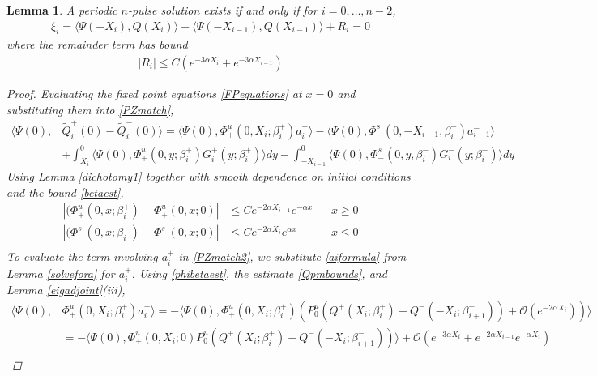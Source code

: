 \documentclass[10pt,reqno]{amsart}
\theoremstyle{plain}
\newtheorem{lemma}[theorem]{Lemma}
\theoremstyle{definition}
\theoremstyle{remark}
\numberwithin{theorem}{section}
\numberwithin{equation}{section}
\begin{document}
\begin{lemma}\label{jumplemma1}
A periodic $n$-pulse solution exists if and only if for $i = 0, \dots, n-2$,
\begin{align}\label{jumpcond2}
\xi_i = \langle \Psi(-X_i), Q(X_i) \rangle - \langle \Psi(-X_{i-1}), Q(X_{i-1}) \rangle + R_i = 0
\end{align}
where the remainder term has bound
\begin{align*}
|R_i| \leq C ( e^{-3 \alpha X_i} +  e^{-3 \alpha X_{i-1}})
\end{align*}
\begin{proof}
Evaluating the fixed point equations \eqref{FPequations} at $x = 0$ and substituting them into \eqref{PZmatch},
\begin{equation}\label{PZmatch2}
\begin{aligned}
\langle \Psi(0), &\tilde{Q}_i^+(0) - \tilde{Q}_i^-(0) \rangle = \langle \Psi(0), \Phi^u_+(0, X_i; \beta_i^+) a_i^+ \rangle
- \langle \Psi(0), \Phi^s_-(0, -X_{i-1}, \beta_i^-) a_{i-1}^- \rangle \\
&+ \int_{X_i}^0 \langle \Psi(0), \Phi_+^u(0, y; \beta_i^+) G_i^+(y; \beta_i^+) \rangle dy - \int_{-X_{i-1}}^0 \langle \Psi(0), \Phi_-^s(0, y, \beta_i^-) G_i^-(y; \beta_i^-) \rangle dy
\end{aligned}
\end{equation}
Using Lemma \ref{dichotomy1} together with smooth dependence on initial conditions and the bound \eqref{betaest},
\begin{equation}\label{phibetaest}
\begin{aligned}
|(\Phi_+^u(0, x; \beta_i^+) - \Phi_+^u(0, x; 0)| &\leq C e^{-2 \alpha X_{i-1}} e^{-\alpha x} && x \geq 0\\
|(\Phi_-^s(0, x; \beta_i^-) - \Phi_-^s(0, x; 0)| &\leq C e^{-2 \alpha X_i}e^{\alpha x} &&  x \leq 0\\
\end{aligned}
\end{equation}
To evaluate the term involving $a_i^+$ in \cref{PZmatch2}, we substitute \cref{aiformula} from Lemma \ref{solvefora} for $a_i^+$. Using \eqref{phibetaest}, the estimate \eqref{Qpmbounds}, and Lemma \ref{eigadjoint}(iii),
\begin{align*}
\langle \Psi(0), &\Phi^u_+(0, X_i; \beta_i^+) a_i^+ \rangle = -\langle \Psi(0), \Phi^u_+(0, X_i; \beta_i^+)\left( P^u_0 ( Q^+(X_i; \beta_i^+) - Q^-(-X_i; \beta_{i+1}^-)) + \mathcal{O}( e^{-2 \alpha X_i} ) \right) \rangle \\
&= -\langle \Psi(0), \Phi^u_+(0, X_i; 0) P^u_0 \left( Q^+(X_i; \beta_i^+) - Q^-(-X_i; \beta_{i+1}^-) \right) \rangle + \mathcal{O}( e^{-3 \alpha X_i} + e^{-2\alpha X_{i-1}}e^{-\alpha X_i} ) \\

\end{align*}
\end{proof}
\end{lemma}
\end{document}

